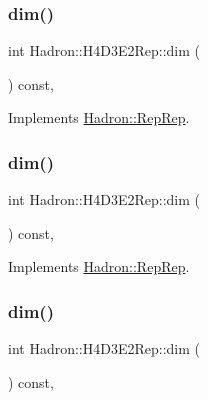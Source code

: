 \subsubsection{\texorpdfstring{dim()}{dim()}\hspace{0.1cm}{\footnotesize\ttfamily [3/5]}}
{\footnotesize\ttfamily int Hadron\+::\+H4\+D3\+E2\+Rep\+::dim (\begin{DoxyParamCaption}{ }\end{DoxyParamCaption}) const\hspace{0.3cm}{\ttfamily [inline]}, {\ttfamily [virtual]}}



Implements \mbox{\hyperlink{structHadron_1_1RepRep_a92c8802e5ed7afd7da43ccfd5b7cd92b}{Hadron\+::\+Rep\+Rep}}.

\mbox{\label{structHadron_1_1H4D3E2Rep_a893b03ad67a5405ffd75b792cc5fe6f1}} 
\subsubsection{\texorpdfstring{dim()}{dim()}\hspace{0.1cm}{\footnotesize\ttfamily [4/5]}}
{\footnotesize\ttfamily int Hadron\+::\+H4\+D3\+E2\+Rep\+::dim (\begin{DoxyParamCaption}{ }\end{DoxyParamCaption}) const\hspace{0.3cm}{\ttfamily [inline]}, {\ttfamily [virtual]}}



Implements \mbox{\hyperlink{structHadron_1_1RepRep_a92c8802e5ed7afd7da43ccfd5b7cd92b}{Hadron\+::\+Rep\+Rep}}.

\mbox{\label{structHadron_1_1H4D3E2Rep_a893b03ad67a5405ffd75b792cc5fe6f1}} 
\subsubsection{\texorpdfstring{dim()}{dim()}\hspace{0.1cm}{\footnotesize\ttfamily [5/5]}}
{\footnotesize\ttfamily int Hadron\+::\+H4\+D3\+E2\+Rep\+::dim (\begin{DoxyParamCaption}{ }\end{DoxyParamCaption}) const\hspace{0.3cm}{\ttfamily [inline]}, {\ttfamily [virtual]}}



